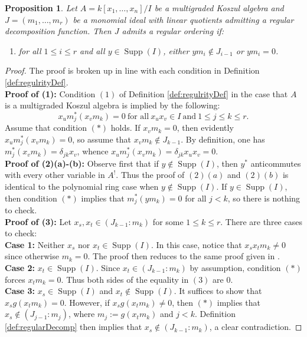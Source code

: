 \documentclass[10pt]{amsart}
\newtheorem{prop}[theorem]{Proposition}
\theoremstyle{definition}
\theoremstyle{remark}
\newtheorem{the context}[theorem]{The Context}
\numberwithin{equation}{theorem}
\numberwithin{equation}{section}
\newcommand{\supp}{\operatorname{Supp}}
\renewcommand{\leq}{\leqslant}
\begin{document}
\begin{prop}
Let $A = k[x_1 , \dots , x_n ] /I$ be a multigraded Koszul algebra and $J = (m_1 , \dots , m_r)$ be a monomial ideal with linear quotients admitting a regular decomposition function. Then $J$ admits a regular ordering if:
\begin{enumerate}[(*)]
    \item for all $1 \leq i \leq r$ and all $y \in \supp (I)$, either $y m_i \notin J_{i-1}$ or $y m_i = 0$.
\end{enumerate}
\end{prop}

\begin{proof}
The proof is broken up in line with each condition in Definition \ref{def:regulrityDef}. \\
\textbf{Proof of (1):} Condition $(1)$ of Definition \ref{def:regulrityDef} in the case that $A$ is a multigraded Koszul algebra is implied by the following:
$$x_u m_j^* ( x_v m_k) = 0 \ \textrm{for all} \ x_u x_v \in I \ \textrm{and} \  1 \leq j \leq k \leq r.$$
Assume that condition $(*)$ holds. If $x_v m_k = 0$, then evidently $x_u m_j^* (x_v m_k) = 0$, so assume that $x_v m_k \notin J_{k-1}$. By definition, one has $m_j^* (x_v m_k) = \delta_{jk} x_v$, whence $x_u m_j^* (x_v m_k) = \delta_{jk} x_u x_v = 0$. \\
\textbf{Proof of (2)(a)-(b):} Observe first that if $y \notin \supp (I)$, then $y^*$ anticommutes with every other variable in $A^!$. Thus the proof of $(2)(a)$ and $(2)(b)$ is identical to the polynomial ring case when $y \notin \supp (I)$. If $y \in \supp (I)$, then condition $(*)$ implies that $m_j^* (y m_k) = 0$ for all $j<k$, so there is nothing to check. \\
\textbf{Proof of (3):} Let $x_s, x_t \in (J_{k-1} : m_k)$ for some $1 \leq k \leq r$. There are three cases to check: \\
\textbf{Case 1:} Neither $x_s$ nor $x_t \in \supp (I)$. In this case, notice that $x_s x_t m_k \neq 0$ since otherwise $m_k = 0$. The proof then reduces to the same proof given in \cite[Lemma 1.11]{herzog2002resolutions}. \\
\textbf{Case 2:} $x_t \in \supp (I)$. Since $x_t \in (J_{k-1} : m_k)$ by assumption, condition $(*)$ forces $x_t m_k = 0$. Thus both sides of the equality in $(3)$ are $0$. \\
\textbf{Case 3:} $x_s \in \supp (I)$ and $x_t \notin \supp (I)$. It suffices to show that $x_s g( x_t m_k) = 0$. However, if $x_s g(x_t m_k) \neq 0$, then $(*)$ implies that $x_s \notin (J_{j-1} : m_j)$, where $m_j := g(x_t m_k)$ and $j<k$. Definition \ref{def:regularDecomp} then implies that $x_s \notin (J_{k-1} : m_k)$, a clear contradiction. 
\end{proof}
\end{document}
